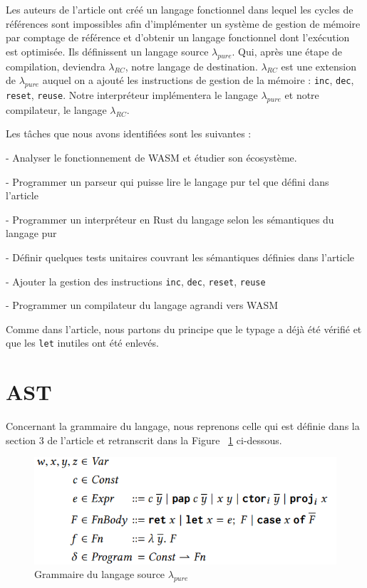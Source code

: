\documentclass{rapportECL}
\begin{document}
Les auteurs de l'article\cite{ullrich_counting_2020} ont créé un langage fonctionnel dans lequel les cycles de références 
sont impossibles afin d'implémenter un système de gestion de mémoire par comptage de référence et d'obtenir un langage fonctionnel 
dont l'exécution est optimisée. Ils définissent un langage source $\lambda_{pure}$. 
Qui, après une étape de compilation, deviendra $\lambda_{RC}$, notre langage de destination.
$\lambda_{RC}$ est une extension de $\lambda_{pure}$ auquel on a ajouté les instructions de gestion de la mémoire : 
\verb|inc|, \verb|dec|, \verb|reset|, \verb|reuse|.
Notre interpréteur implémentera le langage $\lambda_{pure}$ et notre compilateur, le langage $\lambda_{RC}$.


Les tâches que nous avons identifiées sont les suivantes :

- Analyser le fonctionnement de WASM et étudier son écosystème.

- Programmer un parseur qui puisse lire le langage pur tel que défini dans l'article\cite{ullrich_counting_2020}

- Programmer un interpréteur en Rust du langage selon les sémantiques du langage pur

- Définir quelques tests unitaires couvrant les sémantiques définies dans l'article

- Ajouter la gestion des instructions \verb|inc|, \verb|dec|, \verb|reset|, \verb|reuse|

- Programmer un compilateur du langage agrandi vers WASM

Comme dans l'article, nous partons du principe que le typage a déjà été vérifié et que les \verb|let| inutiles ont été enlevés.

\section{AST}

Concernant la grammaire du langage, nous reprenons celle qui est définie dans la section 3 de l'article et retranscrit dans la Figure ~\ref{fig:grammaire pure} ci-dessous.

\begin{figure}[hbt!]
	\centering
	\includegraphics[scale=0.80]{logos/grammaire.png}
	\caption{Grammaire du langage source $\lambda_{pure}$}
	\label{fig:grammaire pure}
\end{figure}
\FloatBarrier
\end{document}
